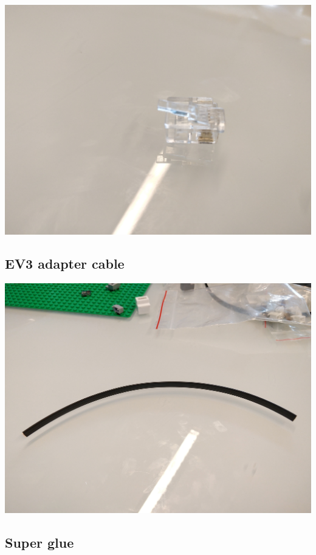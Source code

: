 \documentclass[a4paper,12pt]{article}
\begin{document}
\includegraphics[width=13.5cm]{ev3-connector.jpg}

\subsection{EV3 adapter cable}

\includegraphics[width=13.5cm]{ev3-cable.jpg}

\subsection{Super glue}
\end{document}
